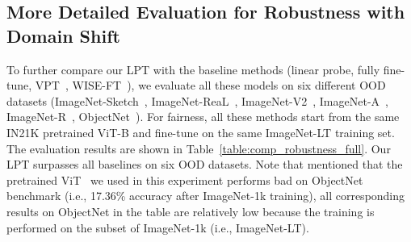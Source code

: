 \documentclass{article} \usepackage{iclr2023_conference,times}
\begin{document}
\begin{table}
\centering
   \caption{Full comparison with different fine-tuning methods on six different OOD dataset. All methods start from the same IN21K pretrained ViT-B feature extractor. Quantitative results show that LPT achieves the best accuracy.}
\setlength{\tabcolsep}{5pt} \renewcommand{\arraystretch}{3.5}{ \fontsize{8.3}{3}}
   \label{table:comp_robustness_full}
\end{table}

\subsection{More Detailed Evaluation for Robustness with Domain Shift}\label{sec:full_domain_shift}
To further compare our LPT with the baseline methods (linear probe, fully fine-tune, VPT~\citep{jia2022vpt}, WISE-FT~\citep{wortsman2022robust}), we evaluate all these models on six different OOD datasets (ImageNet-Sketch~\citep{wang2019learning}, ImageNet-ReaL~\citep{imagenetreal}, ImageNet-V2~\citep{imagenetv2}, ImageNet-A~\citep{imageneta}, ImageNet-R~\citep{imagenetr}, ObjectNet~\citep{objectnet}). For fairness, all these methods start from the same IN21K pretrained ViT-B and fine-tune on the same ImageNet-LT training set. The evaluation results are shown in Table~\ref{table:comp_robustness_full}. Our LPT surpasses all baselines on six OOD datasets. Note that \citet{herrmann2022pyramid} mentioned that the pretrained ViT~\citep{dosovitskiy2021an} we used in this experiment performs bad on ObjectNet benchmark (i.e., 17.36\% accuracy after ImageNet-1k training), all corresponding results on ObjectNet in the table are relatively low because the training is performed on the subset of ImageNet-1k (i.e., ImageNet-LT). 
\end{document}
